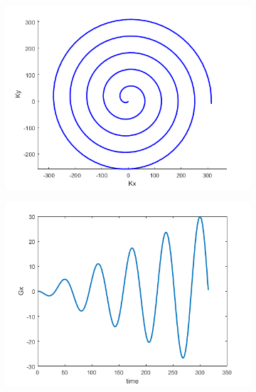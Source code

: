 \documentclass[12pt]{article}
\begin{document}
\begin{figure}[H]
\begin{subfigure}{\textwidth}
	
	\includegraphics[width=\textwidth]{Figures/SpiralK.png}
	\caption{}
	\label{Fig:spiralK}
\end{subfigure}
\begin{subfigure}{0.5\textwidth}
	
	\includegraphics[width=\textwidth]{Figures/SpiralGx.png}
	\caption{}
	\label{Fig:spiralGx}
\end{subfigure}
\begin{subfigure}{0.5\textwidth}
	

\end{subfigure}
\end{figure}
\end{document}
